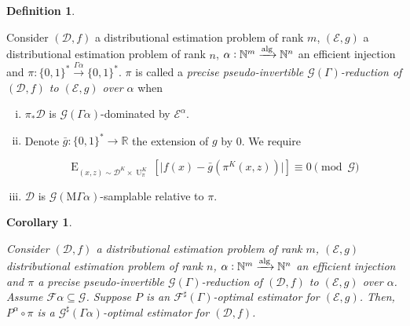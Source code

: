 \documentclass[11pt]{article}
\numberwithin{equation}{section}
\theoremstyle{definition}
\newtheorem{definition}{Definition}[section]
\theoremstyle{plain}
\newtheorem{corollary}{Corollary}[section]
\newcommand{\Bool}{\{0,1\}}
\newcommand{\Words}{{\Bool^*}}
\DeclareMathOperator{\E}{E}
\DeclareMathOperator{\Un}{U}
\newcommand{\Nats}{\mathbb{N}}
\newcommand{\Reals}{\mathbb{R}}
\newcommand{\Abs}[1]{\lvert #1 \rvert}
\newcommand{\Dist}{\mathcal{D}}
\newcommand{\MGrow}{\mathrm{M}\Gamma}
\newcommand{\Fall}{\mathcal{F}}
\newcommand{\ESG}{\Fall^\sharp(\Gamma)}
\newcommand{\Alg}{\xrightarrow{\textnormal{alg}}}
\begin{document}
\begin{samepage}
\begin{definition}
\label{def:pp_reduce}

Consider $(\Dist,f)$ a distributional estimation problem of rank ${m}$, $(\mathcal{E},g)$ a distributional estimation problem of rank ${n}$, ${\alpha: \Nats^m \Alg \Nats^n}$ an efficient injection and ${\pi: \Words \xrightarrow{\Gamma \alpha} \Words}$. $\pi$ is called a \emph{precise pseudo-invertible $\mathcal{G}(\Gamma)$-reduction of $(\Dist,f)$ to $(\mathcal{E},g)$ over ${\alpha}$} when

\begin{enumerate}[(i)]

\item\label{con:def__pp_reduce__dist} ${\pi_*\Dist}$ is ${\mathcal{G}(\Gamma \alpha)}$-dominated by ${\mathcal{E}^\alpha}$.

\item\label{con:def__pp_reduce__fun} Denote ${\bar{g}: \Words \rightarrow \Reals}$ the extension of $g$ by 0. We require

\[\E_{(x,z) \sim \Dist^{K} \times \Un_\pi^{K}}[\Abs{f(x)-\bar{g}(\pi^{K}(x,z))}] \equiv 0 \pmod {\mathcal{G}}\]

\item\label{con:def__pp_reduce__smp} $\Dist$ is $\mathcal{G}(\MGrow \alpha)$-samplable relative to $\pi$.

\end{enumerate}

\end{definition}
\end{samepage}

\begin{samepage}


\begin{corollary}
\label{crl:pp_reduce_sharp}

Consider $(\Dist,f)$ a distributional estimation problem of rank ${m}$, $(\mathcal{E},g)$ distributional estimation problem of rank ${n}$, ${\alpha: \Nats^m \Alg \Nats^n}$ an efficient injection and $\pi$ a precise pseudo-invertible $\mathcal{G}(\Gamma)$-reduction of $(\Dist, f)$ to $(\mathcal{E}, g)$ over ${\alpha}$. Assume ${\Fall\alpha \subseteq \mathcal{G}}$. Suppose $P$ is an $\ESG$-optimal estimator for $(\mathcal{E}, g)$. Then, $P^\alpha \circ \pi$ is a $\mathcal{G}^\sharp (\Gamma \alpha)$-optimal estimator for $(\Dist, f)$.

\end{corollary}
\end{samepage}
\end{document}
